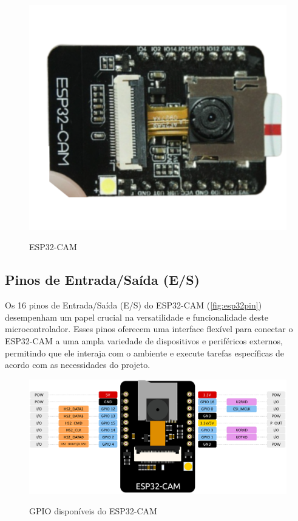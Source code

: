 \begin{figure}[h!]
    \centering
    \caption{ESP32-CAM}
    \includegraphics[scale=0.25]{figuras/esp32cam.png}
    \label{fig:espcam}
    \centering
\end{figure}

\subsection{Pinos de Entrada/Saída (E/S)}\label{sec:gpio}

Os 16 pinos de Entrada/Saída (E/S) do ESP32-CAM (\autoref{fig:esp32pin})
desempenham um papel crucial na versatilidade
e funcionalidade deste microcontrolador.
Esses pinos oferecem uma interface flexível para conectar o
ESP32-CAM a uma ampla variedade de dispositivos e periféricos
externos, permitindo que ele interaja com o ambiente e execute
tarefas específicas de acordo com as necessidades do projeto.

\begin{figure}[h!]
    \centering
    \caption{GPIO disponíveis do ESP32-CAM}
    \includegraphics[scale=0.28]{figuras/esp32pin.jpg}
    \label{fig:esp32pin}
    \centering
\end{figure}

